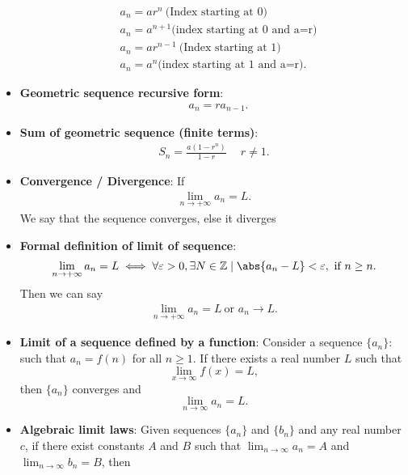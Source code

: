 \documentclass{report}
\begin{document}
\begin{itemize}
\begin{align*}
            &a_{n} = ar^{n}\ \text{(Index starting at 0)} \\
            &a_{n} = a^{n+1} \text{(index starting at 0 and a=r)} \\
            &a_{n} = ar^{n-1}\ \text{(Index starting at 1)} \\
            &a_{n} = a^{n} \text{(index starting at 1 and a=r)}
        .\end{align*}
    \item \textbf{Geometric sequence recursive form}:
        \begin{align*}
            &a_{n} = ra_{n-1}
        .\end{align*}
    \item \textbf{Sum of geometric sequence (finite terms)}:
        \begin{align*}
            S_{n} = \frac{a(1-r^{n})}{1-r}\ \quad r\ne 1
        .\end{align*}
    \item \textbf{Convergence / Divergence}: If 
        \begin{align*}
            \lim\limits_{n \to +\infty}{a_{n}} = L
        .\end{align*}
        We say that the sequence converges, else it diverges
    \item \textbf{Formal definition of limit of sequence}:
        \begin{align*}
            \lim\limits_{n \to +\infty}{a_{n}= L} \iff \forall \varepsilon > 0, \exists N \in \mathbb{Z} \mid \abs{a_{n} - L} < \varepsilon,\ \text{if } n \geq n
        .\end{align*}
        Then we can say 
        \begin{align*}
            \lim\limits_{n \to +\infty}{a_{n} = L}\ \text{or } a_{n} \rightarrow L 
        .\end{align*}
    \item \textbf{Limit of a sequence defined by a function}:         Consider a sequence \( \{a_n\}: \) such that \( a_n = f(n) \) for all \( n \geq 1 \). If there exists a real number \( L \) such that
        \[
            \lim_{{x \to \infty}} f(x) = L,
        \]
        then \( \{a_n\} \) converges and
        \[
            \lim_{{n \to \infty}} a_n = L.
        \]
    \item \textbf{Algebraic limit laws}:
        Given sequences \( \{a_n\} \) and \( \{b_n\} \) and any real number \( c \), if there exist constants \( A \) and \( B \) such that \( \lim_{{n \to \infty}} a_n = A \) and \( \lim_{{n \to \infty}} b_n = B \), then

\end{itemize}
\end{document}
